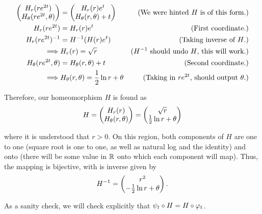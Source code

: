 \begin{solution}
    \alignbreak
    \begin{align}
        \begin{pmatrix}H_r(re^{2t})\\ H_\theta(re^{2t}, \theta)\end{pmatrix} &= \begin{pmatrix}H_r(r)e^t\\H_\theta(r, \theta)+ t\end{pmatrix} &\text{(We were hinted $H$ is of this form.)}\nonumber\\
        H_r(re^{2t}) &= H_r(r)e^t &\text{(First coordinate.)}\nonumber\\
        H_r(re^{2t})^{-1}&= H^{-1}(H(r)e^t) &\text{(Taking inverse of $H$.)}\nonumber\\
        \implies& H_r(r) = \sqrt{r} &\text{($H^{-1}$ should undo $H$, this will work.)}\nonumber\\
        H_\theta(re^{2t}, \theta) &= H_\theta(r, \theta) + t &\text{(Second coordinate.)}\nonumber\\
        \implies& H_\theta(r, \theta) = \frac{1}{2}\ln r + \theta &\text{(Taking in $re^{2t}$, should output $\theta$.)}\nonumber
    \end{align}
    \alignbreak

    Therefore, our homeomorphism $H$ is found as 
    \[
    H = \begin{pmatrix}H_r(r)\\H_\theta(r, \theta)\end{pmatrix} = \begin{pmatrix}\sqrt{r}\\ \frac{1}{2}\ln r + \theta\end{pmatrix}
    \]

    where it is understood that $r > 0$. On this region, both components of $H$ are one to one (square root is one to one, as well as natural log and the identity) and onto (there will be some value in $\mathbb{R}$ onto which each component will map). Thus, the mapping is bijective, with is inverse given by 
    \[
    H^{-1} = \begin{pmatrix}r^2\\ -\frac{1}{2}\ln r + \theta\end{pmatrix}.
    \]

    As a sanity check, we will check explicitly that $\psi_t \circ H = H \circ \varphi_t$.
\end{solution}


